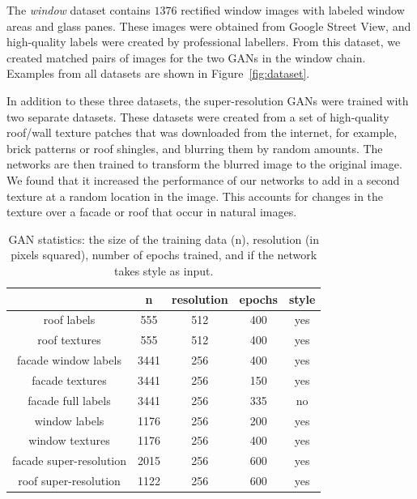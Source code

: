 The \emph{window} dataset contains $1376$ rectified window images with labeled window areas and glass panes. These images were obtained from Google Street View, and high-quality labels were created by professional labellers.
%
From this dataset, we created matched pairs of images for the two GANs in the window chain. Examples from all datasets are shown in Figure~\ref{fig:dataset}.

In addition to these three datasets, the super-resolution GANs were trained with two separate datasets. These datasets were created from a set of high-quality roof/wall texture patches that was downloaded from the internet, for example, brick patterns or roof shingles, and blurring them by random amounts. The networks are then trained to transform the blurred image to the original image. We found that it increased the performance of our networks to add in a second texture at a random location in the image. This accounts for changes in the texture over a facade or roof that occur in natural images.

\begin{table}
\centering
\small

\caption{GAN statistics:
the size of the training data (n), resolution (in pixels squared), number of epochs trained, and if the network takes style as input.}

\begin{tabular}{ccccc}
\hline
& n & resolution & epochs & style \\
\hline
roof labels & 555 & 512 & 400 & yes \\
roof textures & 555 & 512 & 400 & yes \\
facade window labels & 3441 & 256 & 400 & yes \\
facade textures & 3441 & 256 & 150 & yes \\
facade full labels & 3441 & 256 & 335 & no \\
window labels & 1176 & 256 & 200 & yes \\
window textures & 1176 & 256 & 400 & yes \\
facade super-resolution & 2015 & 256 & 600 & yes \\
roof super-resolution & 1122 & 256 & 600 & yes \\
\hline
\end{tabular}

\label{table:net_statistics}
\end{table}

